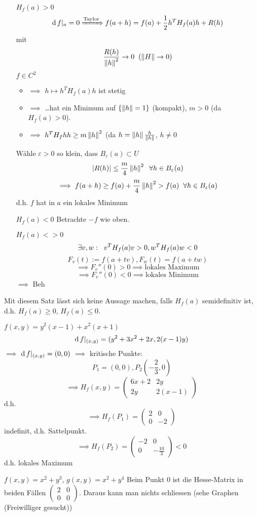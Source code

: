 \begin{Bew}
  \begin{itemize}
    \item[$H_f(a)>0$]
      \[\operatorname{d} f|_a=0\xRightarrow{\text{Taylor}}f(a+h)=f(a)+\frac{1}{2}h^TH_f(a)h+R(h)\\\]
      mit
      \[\frac{R(h)}{\left\| h \right\|^2}\rightarrow 0 \hspace{2mm}(\left\| H \right\|\rightarrow 0)\]
      $f\in C^2$
      \begin{itemize}
        \item $\implies$ $h\mapsto h^TH_f(a)h$ ist stetig
        \item $\implies$ \ldots hat ein Minimum auf $\left\{ \left\| h \right\|=1 \right\}$ (kompakt), $m > 0$ (da $H_f(a)>0$).
        \item $\implies$ $h^TH_f hh\geq m\left\| h \right\|^2$ (da $h=\left\| h \right\|\frac{h}{\left\| h \right\|}$, $h\neq 0$
      \end{itemize}
      Wähle $\varepsilon>0$ so klein, dass $B_\varepsilon(a)\subset U$
      \[\left| R(h) \right|\leq \frac{m}{4}\left\| h \right\|^2\hspace{2mm}\forall h\in B_\varepsilon(a)\]
      \[\implies f(a+h)\geq f(a)+\frac{m}{4}\left\| h \right\|^2>f(a)\hspace{2mm}\forall h\in B_\varepsilon(a)\]
      d.h. $f$ hat in $a$ ein lokales Minimum
    \item[$H_f(a)<0$]
       Betrachte $-f$ wie oben.
    \item[$H_f(a)<>0$] %
      \[\exists v,w :\hspace{2mm} v^T H_f(a) v>0, w^T H_f(a) w<0\]
      \[F_v(t):=f(a+tv), F_w(t)=f(a+tw)\]
      \[\implies F_v''(0)>0 \implies \text{lokales Maximum}\]
      \[\implies F_v''(0)<0 \implies \text{lokales Minimum}\]
      $\implies$ Beh
  \end{itemize}
\end{Bew}
\begin{Bem}
  Mit diesem Satz lässt sich keine Aussage machen, falls $H_f(a)$ semidefinitiv ist, d.h. $H_f(a)\geq 0$, $H_f(a)\leq 0$.
\end{Bem}
\begin{Bsp}
  $f(x,y)=y^2(x-1)+x^2(x+1)$
  \[\operatorname{d} f|_{(x,y)} = (y^2+3x^2+2x, 2(x-1)y)\]
  $\implies$ $\operatorname{d} f|_{(x,y)}=(0,0)$ $\implies$ kritische Punkte:
  \[P_1=(0,0), P_2(-\frac{2}{3}, 0)\]
  \[\implies H_f(x,y)= \begin{pmatrix}
    6x+2&2y\\
    2y&2(x-1)
  \end{pmatrix}\]
  d.h.
  \[\implies H_f(P_1)= \begin{pmatrix}
    2&0\\
    0&-2
  \end{pmatrix}\]
  indefinit, d.h. Sattelpunkt.
  \[\implies H_f(P_2)= \begin{pmatrix}
    -2&0\\
    0&-\frac{10}{3}
  \end{pmatrix}<0\]
  d.h. lokales Maximum
\end{Bsp}
\begin{Bsp}
  $f(x,y)=x^2+y^3$, $g(x,y)=x^2+y^4$
  Beim Punkt 0 ist die Hesse-Matrix in beiden Fällen $\begin{pmatrix} 2&0\\ 0&0 \end{pmatrix}$. Daraus kann man nichts schliessen (sehe Graphen (Freiwilliger gesucht))
\end{Bsp}
